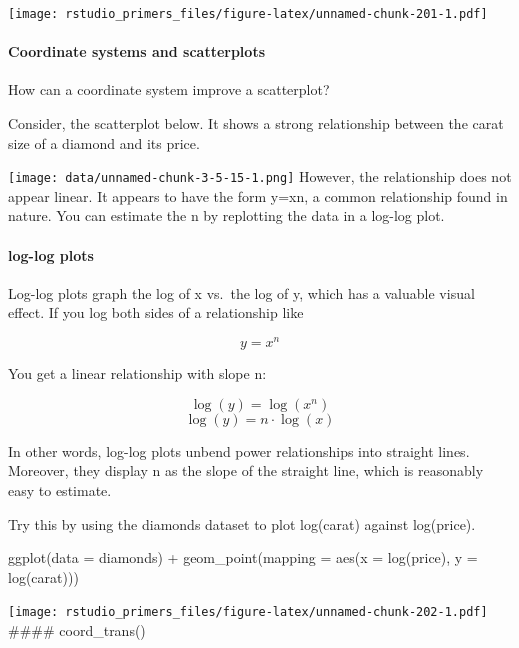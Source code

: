\documentclass[
]{article}
\newenvironment{Shaded}{\begin{snugshade}}{\end{snugshade}}
\newcommand{\AttributeTok}[1]{\textcolor[rgb]{0.77,0.63,0.00}{#1}}
\newcommand{\FunctionTok}[1]{\textcolor[rgb]{0.00,0.00,0.00}{#1}}
\newcommand{\NormalTok}[1]{#1}
\newcommand{\SpecialCharTok}[1]{\textcolor[rgb]{0.00,0.00,0.00}{#1}}
\begin{document}
\texttt{[image: rstudio\_primers\_files/figure-latex/unnamed-chunk-201-1.pdf]}

\hypertarget{coordinate-systems-and-scatterplots}{%
\paragraph{Coordinate systems and
scatterplots}\label{coordinate-systems-and-scatterplots}}

How can a coordinate system improve a scatterplot?

Consider, the scatterplot below. It shows a strong relationship between
the carat size of a diamond and its price.

\texttt{[image: data/unnamed-chunk-3-5-15-1.png]} However, the
relationship does not appear linear. It appears to have the form y=xn, a
common relationship found in nature. You can estimate the n by
replotting the data in a log-log plot.

\hypertarget{log-log-plots}{%
\paragraph{log-log plots}\label{log-log-plots}}

Log-log plots graph the log of x vs.~the log of y, which has a valuable
visual effect. If you log both sides of a relationship like

\[y = x^n\]

You get a linear relationship with slope n:

\[\log(y) = \log(x^n)\] \[\log(y)= n\cdot \log(x)\]

In other words, log-log plots unbend power relationships into straight
lines. Moreover, they display n as the slope of the straight line, which
is reasonably easy to estimate.

Try this by using the diamonds dataset to plot log(carat) against
log(price).

\begin{Shaded}
\begin{Highlighting}[]
\FunctionTok{ggplot}\NormalTok{(}\AttributeTok{data =}\NormalTok{ diamonds) }\SpecialCharTok{+} 
  \FunctionTok{geom\_point}\NormalTok{(}\AttributeTok{mapping =} \FunctionTok{aes}\NormalTok{(}\AttributeTok{x =} \FunctionTok{log}\NormalTok{(price), }\AttributeTok{y =} \FunctionTok{log}\NormalTok{(carat)))}
\end{Highlighting}
\end{Shaded}

\texttt{[image: rstudio\_primers\_files/figure-latex/unnamed-chunk-202-1.pdf]}
\#\#\#\# coord\_trans()
\end{document}
